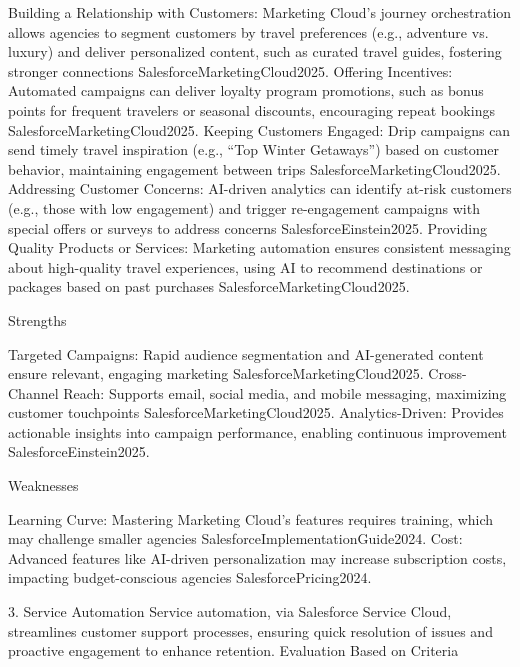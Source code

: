 Building a Relationship with Customers: Marketing Cloud’s journey orchestration allows agencies to segment customers by travel preferences (e.g., adventure vs. luxury) and deliver personalized content, such as curated travel guides, fostering stronger connections {SalesforceMarketingCloud2025}.
Offering Incentives: Automated campaigns can deliver loyalty program promotions, such as bonus points for frequent travelers or seasonal discounts, encouraging repeat bookings {SalesforceMarketingCloud2025}.
Keeping Customers Engaged: Drip campaigns can send timely travel inspiration (e.g., “Top Winter Getaways”) based on customer behavior, maintaining engagement between trips {SalesforceMarketingCloud2025}.
Addressing Customer Concerns: AI-driven analytics can identify at-risk customers (e.g., those with low engagement) and trigger re-engagement campaigns with special offers or surveys to address concerns {SalesforceEinstein2025}.
Providing Quality Products or Services: Marketing automation ensures consistent messaging about high-quality travel experiences, using AI to recommend destinations or packages based on past purchases {SalesforceMarketingCloud2025}.

Strengths

Targeted Campaigns: Rapid audience segmentation and AI-generated content ensure relevant, engaging marketing {SalesforceMarketingCloud2025}.
Cross-Channel Reach: Supports email, social media, and mobile messaging, maximizing customer touchpoints {SalesforceMarketingCloud2025}.
Analytics-Driven: Provides actionable insights into campaign performance, enabling continuous improvement {SalesforceEinstein2025}.

Weaknesses

Learning Curve: Mastering Marketing Cloud’s features requires training, which may challenge smaller agencies {SalesforceImplementationGuide2024}.
Cost: Advanced features like AI-driven personalization may increase subscription costs, impacting budget-conscious agencies {SalesforcePricing2024}.

3. Service Automation
Service automation, via Salesforce Service Cloud, streamlines customer support processes, ensuring quick resolution of issues and proactive engagement to enhance retention.
Evaluation Based on Criteria

